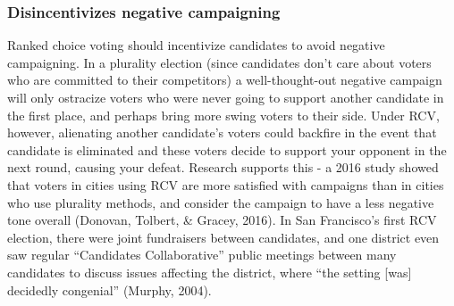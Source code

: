 \documentclass[12pt,twoside]{reedthesis}
\begin{document}
\hypertarget{disincentivizes-negative-campaigning}{%
\subsubsection{Disincentivizes negative campaigning}\label{disincentivizes-negative-campaigning}}

Ranked choice voting should incentivize candidates to avoid negative campaigning. In a plurality election (since candidates don't care about voters who are committed to their competitors) a well-thought-out negative campaign will only ostracize voters who were never going to support another candidate in the first place, and perhaps bring more swing voters to their side. Under RCV, however, alienating another candidate's voters could backfire in the event that candidate is eliminated and these voters decide to support your opponent in the next round, causing your defeat. Research supports this - a 2016 study showed that voters in cities using RCV are more satisfied with campaigns than in cities who use plurality methods, and consider the campaign to have a less negative tone overall (Donovan, Tolbert, \& Gracey, 2016). In San Francisco's first RCV election, there were joint fundraisers between candidates, and one district even saw regular ``Candidates Collaborative'' public meetings between many candidates to discuss issues affecting the district, where ``the setting {[}was{]} decidedly congenial'' (Murphy, 2004).
\end{document}
